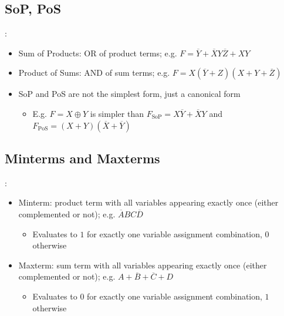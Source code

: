 \documentclass{../slides}
\begin{document}
\subsection{SoP, PoS}
\begin{frame}{\secname: \subsecname}
    \begin{itemize}
        \item Sum of Products: OR of product terms; e.g. $F = \overbar{Y} + \overbar{X}Y\overbar{Z} + XY$
        \item Product of Sums: AND of sum terms; e.g. $F = X(\overbar{Y} + Z)(X + Y + \overbar{Z})$
        \item SoP and PoS are not the simplest form, just a canonical form
        \begin{itemize}
            \item E.g. $F = X \oplus Y$ is simpler than $F_{\text{SoP}} = X\overbar{Y} + \overbar{X}Y$ and $F_{\text{PoS}} = (X + Y)(\overbar{X} + \overbar{Y})$
        \end{itemize}
    \end{itemize}
\end{frame}

\subsection{Minterms and Maxterms}
\begin{frame}{\secname: \subsecname}
    \begin{itemize}
        \item Minterm: product term with all variables appearing exactly once (either complemented or not); e.g. $\overbar{A}BC\overbar{D}$
        \begin{itemize}
            \item Evaluates to $1$ for exactly one variable assignment combination, $0$ otherwise
        \end{itemize}
        \item Maxterm: sum term with all variables appearing exactly once (either complemented or not); e.g. $A + \overbar{B} + \overbar{C} + D$
        \begin{itemize}
            \item Evaluates to $0$ for exactly one variable assignment combination, $1$ otherwise
        \end{itemize}
    \end{itemize}
\end{frame}
\end{document}
